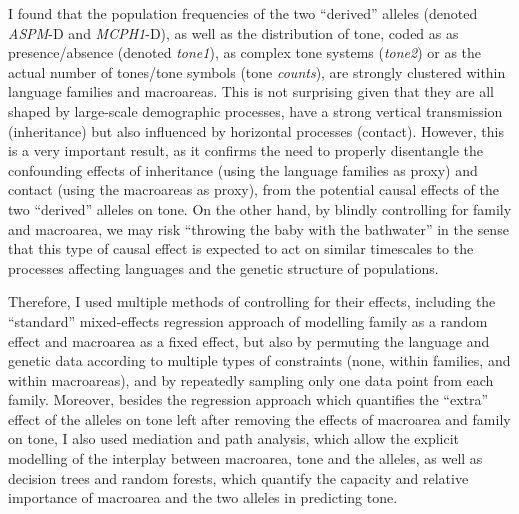 \documentclass[twoside,onecolumn]{article}
\begin{document}
I found that the population frequencies of the two ``derived'' alleles (denoted \textit{ASPM}-D and \textit{MCPH1}-D), as well as the distribution of tone, coded as as presence/absence (denoted \textit{tone1}), as complex tone systems (\textit{tone2}) or as the actual number of tones/tone symbols (tone \textit{counts}), are strongly clustered within language families and macroareas.
This is not surprising given that they are all shaped by large-scale demographic processes, have a strong vertical transmission (inheritance) but also influenced by horizontal processes (contact).
However, this is a very important result, as it confirms the need to properly disentangle the confounding effects of inheritance (using the language families as proxy) and contact (using the macroareas as proxy), from the potential causal effects of the two ``derived'' alleles on tone.
On the other hand, by blindly controlling for family and macroarea, we may risk ``throwing the baby with the bathwater'' in the sense that this type of causal effect is expected to act on similar timescales to the processes affecting languages and the genetic structure of populations.

Therefore, I used multiple methods of controlling for their effects, including the ``standard'' mixed-effects regression approach of modelling family as a random effect and macroarea as a fixed effect, but also by permuting the language and genetic data according to multiple types of constraints (none, within families, and within macroareas), and by repeatedly sampling only one data point from each family.
Moreover, besides the regression approach which quantifies the ``extra'' effect of the alleles on tone left after removing the effects of macroarea and family on tone, I also used mediation and path analysis, which allow the explicit modelling of the interplay between macroarea, tone and the alleles, as well as decision trees and random forests, which quantify the capacity and relative importance of macroarea and the two alleles in predicting tone.
\end{document}
